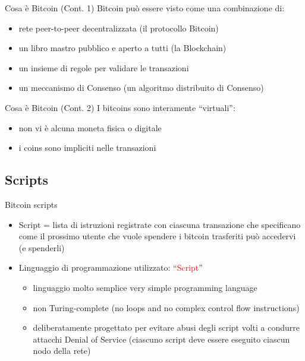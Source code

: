 \documentclass{beamer}
\newcommand\red[1]{\textcolor{red}{#1}}
\begin{document}
  \begin{frame}{Cosa è Bitcoin (Cont. 1)}
    Bitcoin può essere visto come una combinazione di: 
    \begin{itemize}
      \item rete peer-to-peer decentralizzata (il protocollo Bitcoin)
      \item un libro mastro pubblico e aperto a tutti (la Blockchain) 
      \item un insieme di regole per validare le transazioni  
      \item un meccanismo di Consenso (un algoritmo distribuito di Consenso) 
    \end{itemize}
  \end{frame}





  \begin{frame}{Cosa è Bitcoin (Cont. 2)}
    I bitcoins sono interamente ``virtuali'': 
    \begin{itemize}
      \item non vi è alcuna moneta fisica o digitale
      \item i coins sono impliciti nelle transazioni 
    \end{itemize}
  \end{frame}





  \subsection{Scripts}
  \begin{frame}{Bitcoin scripts}
    \begin{itemize}
      \item Script = lista di istruzioni registrate con ciascuna transazione che specificano come il prossimo utente che vuole spendere i bitcoin trasferiti può accedervi (e spenderli) \pause 
      \item Linguaggio di programmazione utilizzato: ``\red{Script}'' \cite{script-bitcoin-wiki} 
      \begin{itemize}
        \item linguaggio molto semplice very simple programming language 
        \item non Turing-complete {\tiny(no loops and no complex control flow instructions)} 
        \item deliberatamente progettato per evitare abusi degli script volti a condurre attacchi Denial of Service {\tiny(ciascuno script deve essere eseguito ciascun nodo della rete)}
      \end{itemize}
    \end{itemize}
  \end{frame}
\end{document}
